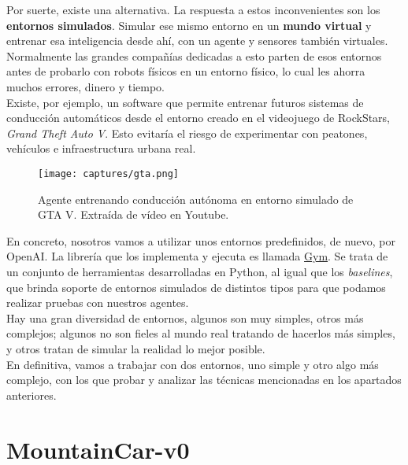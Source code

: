 \documentclass[11pt,fleqn]{book} %
\begin{document}
Por suerte, existe una alternativa. La respuesta a estos inconvenientes son los \textbf{entornos simulados}. Simular ese mismo entorno en un \textbf{mundo virtual} y entrenar esa inteligencia desde ahí, con un agente y sensores también virtuales. Normalmente las grandes compañías dedicadas a esto parten de esos entornos antes de probarlo con robots físicos en un entorno físico, lo cual les ahorra muchos errores, dinero y tiempo. \\

Existe, por ejemplo, un software que permite entrenar futuros sistemas de conducción automáticos desde el entorno creado en el videojuego de RockStars, \textit{Grand Theft Auto V}. Esto evitaría el riesgo de experimentar con peatones, vehículos e infraestructura urbana real. \\

\begin{figure}[H]
	\centering\texttt{[image: captures/gta.png]}
	\caption{Agente entrenando conducción autónoma en entorno simulado de GTA V. Extraída de vídeo en Youtube. \cite{article:gta}}
	\label{fig:gta} %
\end{figure}

En concreto, nosotros vamos a utilizar unos entornos predefinidos, de nuevo, por OpenAI. La librería que los implementa y ejecuta es llamada \href{https://gym.openai.com/}{Gym}. Se trata de un conjunto de herramientas desarrolladas en Python, al igual que los \textit{baselines}, que brinda soporte de entornos simulados de distintos tipos para que podamos realizar pruebas con nuestros agentes. \\

Hay una gran diversidad de entornos, algunos son muy simples, otros más complejos; algunos no son fieles al mundo real tratando de hacerlos más simples, y otros tratan de simular la realidad lo mejor posible. \\

En definitiva, vamos a trabajar con dos entornos, uno simple y otro algo más complejo, con los que probar y analizar las técnicas mencionadas en los apartados anteriores. \cite{article:gym} \cite{article:entornos}

\section{MountainCar-v0}\label{sec:mountaincar}
\end{document}
